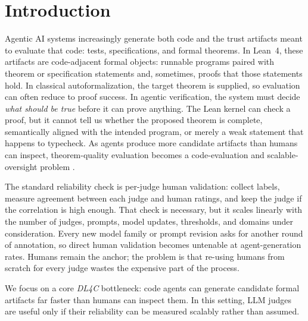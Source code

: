 \documentclass{article}
\begin{document}
\section{Introduction}
Agentic AI systems increasingly generate both code and the trust artifacts meant to evaluate that code: tests, specifications, and formal theorems.
In Lean~4, these artifacts are code-adjacent formal objects: runnable programs paired with theorem or specification statements and, sometimes, proofs that those statements hold.
In classical autoformalization, the target theorem is supplied, so evaluation can often reduce to proof success.
In agentic verification, the system must decide \emph{what should be true} before it can prove anything.
The Lean kernel can check a proof, but it cannot tell us whether the proposed theorem is complete, semantically aligned with the intended program, or merely a weak statement that happens to typecheck.
As agents produce more candidate artifacts than humans can inspect, theorem-quality evaluation becomes a code-evaluation and scalable-oversight problem \citep{bowman2022scalable,zhou2025graders,khattab2024dspy,cheng2024trace}.

The standard reliability check is per-judge human validation: collect labels, measure agreement between each judge and human ratings, and keep the judge if the correlation is high enough.
That check is necessary, but it scales linearly with the number of judges, prompts, model updates, thresholds, and domains under consideration.
Every new model family or prompt revision asks for another round of annotation, so direct human validation becomes untenable at agent-generation rates.
Humans remain the anchor; the problem is that re-using humans from scratch for every judge wastes the expensive part of the process.


We focus on a core \emph{DL4C} bottleneck: code agents can generate candidate formal artifacts far faster than humans can inspect them. In this setting, LLM judges are useful only if their reliability can be measured scalably rather than assumed.
\end{document}

